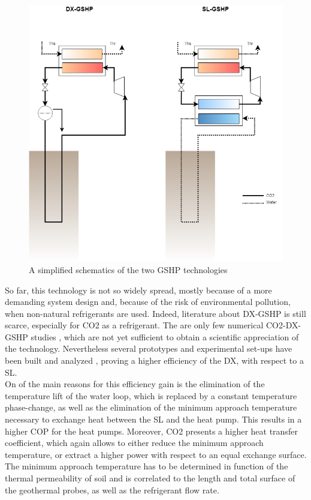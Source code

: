 \documentclass{article}
\begin{document}
\begin{figure}[h!]
\centering
\includegraphics[width=1\textwidth]{GSHP.png}
\caption{A simplified schematics of the two GSHP technologies}
\label{fig:gshp}
\end{figure}

So far, this technology is not so widely spread, mostly because of a more demanding system design and, because of the risk of environmental pollution, when non-natural refrigerants are used. Indeed, literature about DX-GSHP is still scarce, especially for CO2 as a refrigerant. The are only few numerical CO2-DX-GSHP studies \cite{eslami-nejadModelingTwophaseCO2filled2014a,ghazizade-ahsaeeEnergyExergyInvestigation2018,austinParametricStudyPerformance2011,eslami-nejadQuasitransientModelTranscritical2015}, which are not yet sufficient to obtain a scientific appreciation of the technology. Nevertheless several prototypes and experimental set-ups have been built and analyzed \cite{eslami-nejadDetailedTheoreticalCharacterization2018, badacheExperimentalStudyCarbon2018, guoTechnoeconomicComparisonDirect2012}, proving a higher efficiency of the DX, with respect to a SL.\\

On of the main reasons for this efficiency gain is the elimination of the temperature lift of the water loop, which is replaced by a constant temperature phase-change, as well as the elimination of the minimum approach temperature necessary to exchange heat between the SL and the heat pump. This results in a higher COP for the heat pumps. 
Moreover, CO2 presents a higher heat transfer coefficient, which again allows to either reduce the minimum approach temperature, or extract a higher power with respect to an equal exchange surface. The minimum approach temperature has to be determined in function of the thermal permeability of soil and is correlated to the length and total surface of the geothermal probes, as well as the refrigerant flow rate.
\end{document}
